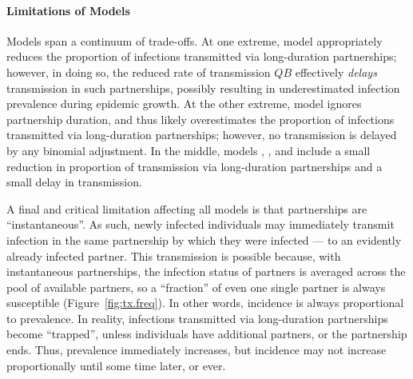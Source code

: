 \paragraph{Limitations of Models }
Models  span a continuum of trade-offs.
At one extreme, model  appropriately reduces the proportion of infections
transmitted via long-duration partnerships;
however, in doing so, the reduced rate of transmission $QB$
effectively \emph{delays} transmission in such partnerships,
possibly resulting in underestimated infection prevalence during epidemic growth.
At the other extreme, model  ignores partnership duration,
and thus likely overestimates the proportion of infections
transmitted via long-duration partnerships;
however, no transmission is delayed by any binomial adjustment.
In the middle, models , , and  include
a small reduction in proportion of transmission via long-duration partnerships
and a small delay in transmission.
\par
A final and critical limitation affecting all models 
is that partnerships are ``instantaneous''.
As such, newly infected individuals may immediately transmit infection
in the same partnership by which they were infected --- to an evidently already infected partner.
This transmission is possible because, with instantaneous partnerships,
the infection status of partners is averaged across the pool of available partners,
so a ``fraction'' of even one single partner is always susceptible (Figure~\ref{fig:tx.freq}).
In other words, incidence is always proportional to prevalence.
In reality, infections transmitted via long-duration partnerships become ``trapped'',
unless individuals have additional partners, or the partnership ends.
Thus, prevalence immediately increases,
but incidence may not increase proportionally until some time later, or ever.
